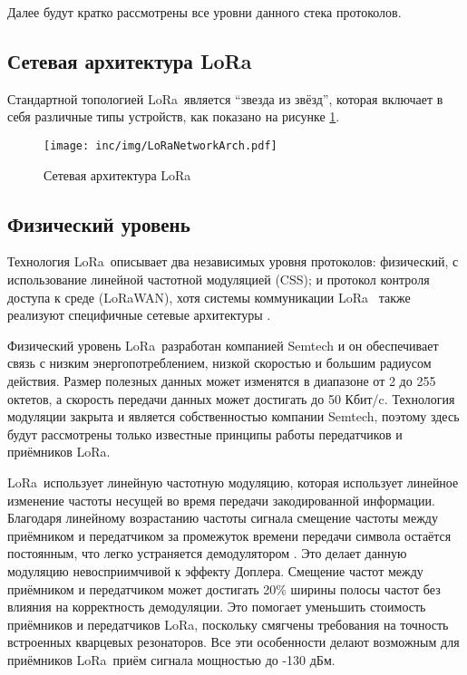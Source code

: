 Далее будут кратко рассмотрены все уровни данного стека протоколов.

\subsection{Сетевая архитектура LoRa\texttrademark}

Стандартной топологией LoRa\texttrademark~является ``звезда из звёзд'', которая 
включает в 
себя различные типы устройств, как показано на рисунке 
\ref{fig:loranetworkarch}.

\begin{figure}[ht]
  \centering
  \texttt{[image: inc/img/LoRaNetworkArch.pdf]}
  \caption{Сетевая архитектура LoRa\texttrademark}
  \label{fig:loranetworkarch}
\end{figure}

\subsection{Физический уровень}

Технология LoRa\texttrademark~описывает два независимых уровня протоколов: 
физический, с 
использование линейной частотной модуляцией (CSS); и протокол контроля доступа 
к 
среде (LoRaWAN\texttrademark), хотя системы коммуникации LoRa\texttrademark~
также реализуют 
специфичные сетевые архитектуры \cite{augustin2016}.

Физический уровень LoRa\texttrademark~разработан компанией Semtech и он 
обеспечивает связь с 
низким энергопотреблением, низкой скоростью и большим радиусом действия.
Размер полезных данных может изменятся в диапазоне от 2 до 255 октетов, а 
скорость передачи данных может достигать до 50 Кбит/c. 
Технология модуляции закрыта и является собственностью компании Semtech, 
поэтому 
здесь будут рассмотрены только известные принципы работы передатчиков и 
приёмников LoRa\texttrademark.

LoRa\texttrademark~использует линейную частотную модуляцию, которая использует 
линейное 
изменение частоты несущей во время передачи закодированной информации.
Благодаря линейному возрастанию частоты сигнала смещение частоты между 
приёмником и передатчиком за промежуток времени передачи символа остаётся 
постоянным, что легко устраняется демодулятором \cite{augustin2016}. 
Это делает данную модуляцию невосприимчивой к эффекту Доплера.
Смещение частот между приёмником и передатчиком может достигать 20\% ширины 
полосы частот без влияния на корректность демодуляции.
Это помогает уменьшить стоимость приёмников и передатчиков LoRa\texttrademark, 
поскольку 
смягчены требования на точность встроенных кварцевых резонаторов.
Все эти особенности делают возможным для приёмников LoRa\texttrademark~приём 
сигнала 
мощностью 
до -130 дБм.

